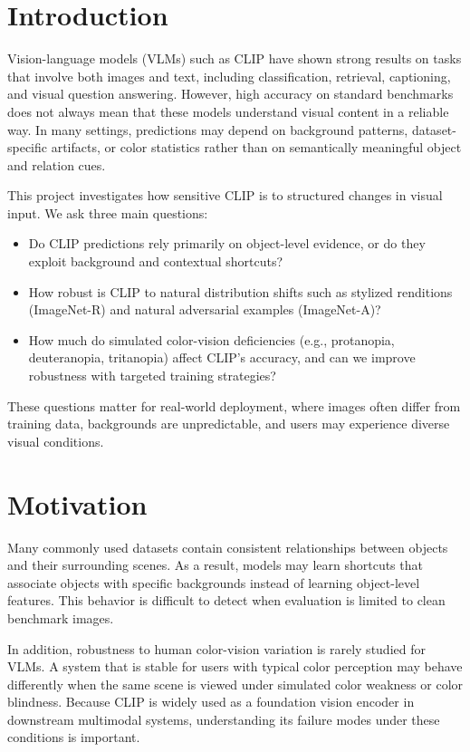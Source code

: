 \documentclass[11pt]{article}
\begin{document}
\vspace{0.5cm}

\section{Introduction}

Vision-language models (VLMs) such as CLIP have shown strong results on tasks that involve both images and text, including classification, retrieval, captioning, and visual question answering. However, high accuracy on standard benchmarks does not always mean that these models understand visual content in a reliable way. In many settings, predictions may depend on background patterns, dataset-specific artifacts, or color statistics rather than on semantically meaningful object and relation cues.

This project investigates how sensitive CLIP is to structured changes in visual input. We ask three main questions:
\begin{itemize}
    \item Do CLIP predictions rely primarily on object-level evidence, or do they exploit background and contextual shortcuts?
    \item How robust is CLIP to natural distribution shifts such as stylized renditions (ImageNet-R) and natural adversarial examples (ImageNet-A)?
    \item How much do simulated color-vision deficiencies (e.g., protanopia, deuteranopia, tritanopia) affect CLIP's accuracy, and can we improve robustness with targeted training strategies?
\end{itemize}
These questions matter for real-world deployment, where images often differ from training data, backgrounds are unpredictable, and users may experience diverse visual conditions.

\section{Motivation}

Many commonly used datasets contain consistent relationships between objects and their surrounding scenes. As a result, models may learn shortcuts that associate objects with specific backgrounds instead of learning object-level features. This behavior is difficult to detect when evaluation is limited to clean benchmark images.

In addition, robustness to human color-vision variation is rarely studied for VLMs. A system that is stable for users with typical color perception may behave differently when the same scene is viewed under simulated color weakness or color blindness. Because CLIP is widely used as a foundation vision encoder in downstream multimodal systems, understanding its failure modes under these conditions is important.
\end{document}
